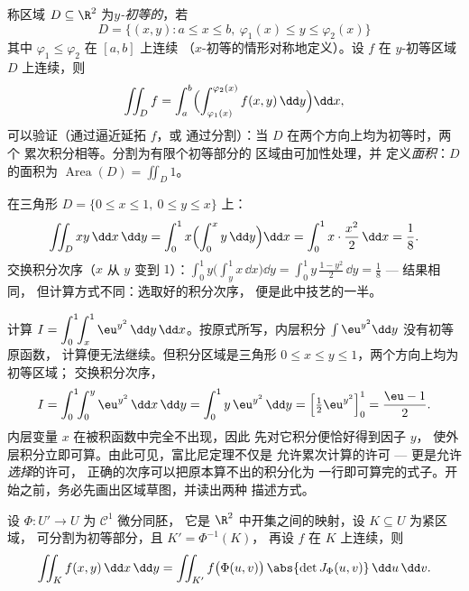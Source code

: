 \begin{definition}[初等区域]\label{def:b2:multint:domain}
称区域 $D \subseteq \R^2$ 为\emph{$y$-初等的}，若
\[
D = \{(x, y) : a \leq x \leq b,\
\varphi_1(x) \leq y \leq \varphi_2(x)\}
\]
其中 $\varphi_1 \leq \varphi_2$ 在 $[a,b]$ 上连续
（$x$-初等的情形对称地定义）。设 $f$ 在
$y$-初等区域 $D$ 上连续，则
\[
\iint_D f
= \int_a^b\Bigl(
\int_{\varphi_1(x)}^{\varphi_2(x)} f(x,y)\,\dd y\Bigr)\dd x ,
\]
可以验证（通过逼近延拓 $f$，或
通过分割）：当 $D$ 在两个方向上均为初等时，两个
累次积分相等。分割为有限个初等部分的
区域由可加性处理，并
定义\emph{面积}：$D$ 的面积为 $\operatorname
{Area}(D) = \iint_D 1$。
\end{definition}

\begin{example}\label{ex:b2:multint:triangle}
在三角形 $D = \{0 \leq x \leq 1,\ 0 \leq y \leq x\}$ 上：
\[
\iint_D xy \,\dd x\,\dd y
= \int_0^1 x\Bigl(\int_0^x y\,\dd y\Bigr)\dd x
= \int_0^1 x\cdot\frac{x^2}{2}\,\dd x = \frac18 .
\]
交换积分次序（$x$ 从 $y$ 变到 $1$）：$\int_0^1
y\bigl(\int_y^1 x\,\dd x\bigr)\dd y = \int_0^1
y\,\frac{1 - y^2}{2}\,\dd y = \frac18$ --- 结果相同，
但计算方式不同：选取好的积分次序，
便是此中技艺的一半。
\end{example}

\begin{example}[只有一种次序可行]\label{ex:b2:multint:swaporder}
计算 $I = \displaystyle\int_0^1\!\!\int_x^1
\eu^{y^2}\,\dd y\,\dd x$。按原式所写，内层积分
$\int\eu^{y^2}\dd y$ 没有初等原函数，
计算便无法继续。但积分区域是三角形 $0 \leq
x \leq y \leq 1$，两个方向上均为初等区域；
交换积分次序，
\[
I = \int_0^1\!\!\int_0^y \eu^{y^2}\,\dd x\,\dd y
= \int_0^1 y\,\eu^{y^2}\,\dd y
= \Bigl[\tfrac12\eu^{y^2}\Bigr]_0^1 = \frac{\eu - 1}{2} .
\]
内层变量 $x$ 在被积函数中完全不出现，因此
先对它积分便恰好得到因子 $y$，
使外层积分立即可算。由此可见，富比尼定理不仅是
允许累次计算的许可 --- 更是允许\emph{选择}的许可，
正确的次序可以把原本算不出的积分化为
一行即可算完的式子。开始之前，务必先画出区域草图，并读出两种
描述方式。
\end{example}

\begin{theorem}[变量替换]\label{thm:b2:multint:changevar}
设 $\Phi \colon U' \to U$ 为 $\mathcal{C}^1$ 微分同胚，
它是 $\R^2$ 中开集之间的映射，设 $K \subseteq U$ 为紧区域，
可分割为初等部分，且 $K' = \Phi^{-1}(K)$，
再设 $f$ 在 $K$ 上连续，则
\[
\iint_K f(x, y)\,\dd x\,\dd y
= \iint_{K'} f\bigl(\Phi(u, v)\bigr)\,
\abs{\det J_\Phi(u, v)}\,\dd u\,\dd v .
\]
\end{theorem}
\admitted

